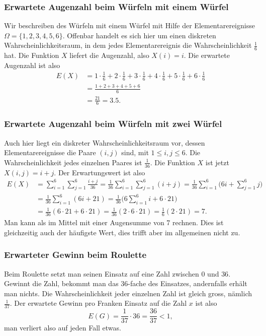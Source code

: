 \subsubsection{Erwartete Augenzahl beim Würfeln mit einem Würfel}
Wir beschreiben des Würfeln mit einem Würfel mit Hilfe der
Elementarereignisse $\Omega=\{1,2,3,4,5,6\}$.
Offenbar handelt es sich
hier um einen diskreten Wahrscheinlichkeitsraum, in dem jedes
Elementarereignis die Wahrscheinlichkeit $\frac16$ hat.
Die Funktion
$X$ liefert die Augenzahl, also $X(i)=i$.
Die erwartete Augenzahl
ist also
\begin{align*}
E(X)&=
1\cdot\frac16+
2\cdot\frac16+
3\cdot\frac16+
4\cdot\frac16+
5\cdot\frac16+
6\cdot\frac16\\
&=\frac{1+2+3+4+5+6}6\\
&=\frac{21}{6}=3.5.
\end{align*}
\subsubsection{Erwartete Augenzahl beim Würfeln mit zwei Würfel}
Auch hier liegt ein diskreter Wahrscheinlichkeitsraum vor, dessen
Elementarereignisse die Paare $(i,j)$ sind, mit $1\le i,j\le 6$.
Die Wahrscheinlichkeit jedes einzelnen Paares ist $\frac1{36}$.
Die Funktion $X$ ist jetzt $X(i,j)=i+j$.
Der Erwartungswert ist
also
\begin{align*}
E(X)&=\sum_{i=1}^6\sum_{j=1}^6\frac{i+j}{36}
=\frac1{36}\sum_{i=1}^6\sum_{j=1}^6(i+j)
=\frac1{36}\sum_{i=1}^6\bigl(6i + \sum_{j=1}^6j\bigr)\\
&=\frac1{36}\sum_{i=1}^6(6i + 21)
=\frac1{36}\bigl(6\sum_{i=1}^6i + 6\cdot21 \bigr)\\
&=\frac1{36}(6\cdot 21 + 6\cdot21 )
=\frac1{36}(2\cdot 6\cdot 21)
=\frac1{6}(2\cdot 21)
=7.
\end{align*}
Man kann als im Mittel mit einer Augensumme von 7 rechnen.
Dies ist
gleichzeitig auch der häufigste Wert, dies trifft aber im allgemeinen
nicht zu.

\subsubsection{Erwarteter Gewinn beim Roulette}
Beim Roulette setzt man seinen Einsatz auf eine Zahl zwischen $0$
und $36$.
Gewinnt die Zahl, bekommt man das 36-fache des Einsatzes,
andernfalls erhält man nichts.
Die Wahrscheinlichkeit jeder einzelnen
Zahl ist gleich gross, nämlich $\frac1{37}$.
Der erwartete Gewinn pro
Franken Einsatz auf die Zahl $x$ ist also
\[
E(G)= \frac1{37}\cdot 36=\frac{36}{37}<1,
\]
man verliert also auf jeden Fall etwas.


